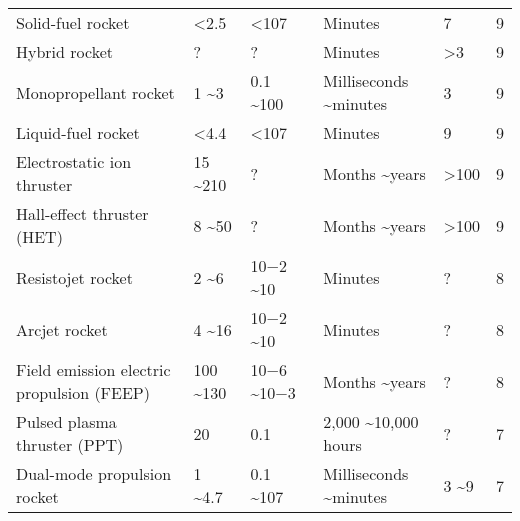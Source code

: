 \begin{landscape}
\begin{longtable}{lllllr}
\bottomrule
\endlastfoot
                                 Solid-fuel rocket &                                 <2.5 &             <107 &                 Minutes &                      7 &    9 \\
                                     Hybrid rocket &                                    ? &                ? &                 Minutes &                     >3 &    9 \\
                             Monopropellant rocket &                                1 \textasciitilde 3 &        0.1 \textasciitilde 100 &  Milliseconds \textasciitilde minutes &                      3 &    9 \\
                                Liquid-fuel rocket &                                 <4.4 &             <107 &                 Minutes &                      9 &    9 \\
                        Electrostatic ion thruster &                             15 \textasciitilde 210 &                ? &          Months \textasciitilde years &                   >100 &    9 \\
                        Hall-effect thruster (HET) &                               8 \textasciitilde 50 &                ? &          Months \textasciitilde years &                   >100 &    9 \\
                                 Resistojet rocket &                                2 \textasciitilde 6 &        10−2 \textasciitilde 10 &                 Minutes &                      ? &    8 \\
                                     Arcjet rocket &                               4 \textasciitilde 16 &        10−2 \textasciitilde 10 &                 Minutes &                      ? &    8 \\
         Field emission electric propulsion (FEEP) &                            100 \textasciitilde 130 &      10−6 \textasciitilde 10−3 &          Months \textasciitilde years &                      ? &    8 \\
                      Pulsed plasma thruster (PPT) &                                   20 &              0.1 &    2,000 \textasciitilde 10,000 hours &                      ? &    7 \\
                       Dual-mode propulsion rocket &                              1 \textasciitilde 4.7 &        0.1 \textasciitilde 107 &  Milliseconds \textasciitilde minutes &                  3 \textasciitilde 9 &    7 \\

\end{longtable}
\end{landscape}
